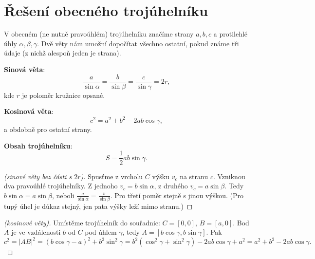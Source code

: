 \section{Řešení obecného trojúhelníku}\label{sec:obecny-trojuhelnik}

V obecném (ne nutně pravoúhlém) trojúhelníku značíme strany $a, b, c$ a protilehlé úhly $\alpha, \beta, \gamma$. Dvě věty nám umožní dopočítat všechno ostatní, pokud známe tři údaje (z nichž alespoň jeden je strana).

\begin{definitionbox}
  \textbf{Sinová věta}:
  \begin{equation*}
    \frac{a}{\sin\alpha} = \frac{b}{\sin\beta} = \frac{c}{\sin\gamma} = 2r,
  \end{equation*}
  kde $r$ je poloměr kružnice opsané.

  \textbf{Kosinová věta}:
  \begin{equation*}
    c^2 = a^2 + b^2 - 2ab\cos\gamma,
  \end{equation*}
  a obdobně pro ostatní strany.

  \textbf{Obsah trojúhelníku}:
  \begin{equation*}
    S = \frac{1}{2}ab\sin\gamma.
  \end{equation*}
\end{definitionbox}

\begin{proof}[(sinové věty bez části s $2r$)]
  Spusťme z vrcholu $C$ výšku $v_c$ na stranu $c$. Vzniknou dva pravoúhlé trojúhelníky. Z jednoho $v_c = b\sin\alpha$, z druhého $v_c = a\sin\beta$. Tedy $b\sin\alpha = a\sin\beta$, neboli $\frac{a}{\sin\alpha} = \frac{b}{\sin\beta}$. Pro třetí poměr stejně s jinou výškou. (Pro tupý úhel je důkaz stejný, jen pata výšky leží mimo stranu.)
\end{proof}

\begin{proof}[(kosinové věty)]
  Umístěme trojúhelník do souřadnic: $C = [0, 0]$, $B = [a, 0]$. Bod $A$ je ve vzdálenosti $b$ od $C$ pod úhlem $\gamma$, tedy $A = [b\cos\gamma, b\sin\gamma]$. Pak
  \begin{equation*}
    c^2 = |AB|^2 = {(b\cos\gamma - a)}^2 + b^2\sin^2\gamma = b^2(\cos^2\gamma + \sin^2\gamma) - 2ab\cos\gamma + a^2 = a^2 + b^2 - 2ab\cos\gamma.
  \end{equation*}
\end{proof}

